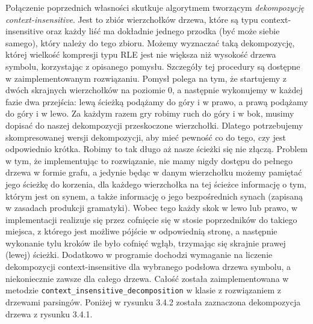 \documentclass[declaration,shortabstract]{iithesis}
\theoremstyle{definition} \newtheorem{definition}{Definicja}[chapter]
\theoremstyle{remark} \newtheorem{remark}[definition]{Obserwacja}
\theoremstyle{plain} \newtheorem{theorem}[definition]{Twierdzenie}
\theoremstyle{remark} \newtheorem{example}{Przykład}[definition]
\theoremstyle{plain} \newtheorem{lemma}[definition]{Lemat}
\begin{document}
Połączenie poprzednich własności skutkuje algorytmem tworzącym \textit{dekompozycję context-insensitive}. Jest to zbiór wierzchołków drzewa, które są typu context-insensitive oraz każdy liść ma dokładnie jednego przodka (być może siebie samego), który należy do tego zbioru. Możemy wyznaczać taką dekompozycję, której wielkość kompresji typu RLE jest nie większa niż wysokość drzewa symbolu, korzystając z opisanego pomysłu. Szczegóły tej procedury są dostępne w zaimplementowanym rozwiązaniu. Pomysł polega na tym, że startujemy z dwóch skrajnych wierzchołków na poziomie $0$, a następnie wykonujemy w każdej fazie dwa przejścia: lewą ścieżką podążamy do góry i w prawo, a prawą podążamy do góry i w lewo. Za każdym razem gry robimy ruch do góry i w bok, musimy dopisać do naszej dekompozycji przeskoczone wierzchołki. Dlatego potrzebujemy skompresowanej wersji dekompozycji, aby mieć pewność co do tego, czy jest odpowiednio krótka. Robimy to tak długo aż nasze ścieżki się nie złączą. Problem w tym, że implementując to rozwiązanie, nie mamy nigdy dostępu do pełnego drzewa w formie grafu, a jedynie będąc w danym wierzchołku możemy pamiętać jego ścieżkę do korzenia, dla każdego wierzchołka na tej ścieżce informację o tym, którym jest on synem, a także informację o jego bezpośrednich synach (zapisaną w zasadach produkcji gramatyki). Wobec tego każdy skok w lewo lub prawo, w implementacji realizuje się przez cofnięcie się w stosie poprzedników do takiego miejsca, z którego jest możliwe pójście w odpowiednią stronę, a następnie wykonanie tylu kroków ile było cofnięć wgłąb, trzymając się skrajnie prawej (lewej) ścieżki. Dodatkowo w programie dochodzi wymaganie na liczenie dekompozycji context-insensitive dla wybranego podsłowa drzewa symbolu, a niekoniecznie zawsze dla całego drzewa. Całość została zaimplementowana w metodzie \texttt{context\_insensitive\_decomposition} w klasie z rozwiązaniem z drzewami parsingów. Poniżej w rysunku 3.4.2 została zaznaczona dekompozycja drzewa z rysunku 3.4.1.
\end{document}

